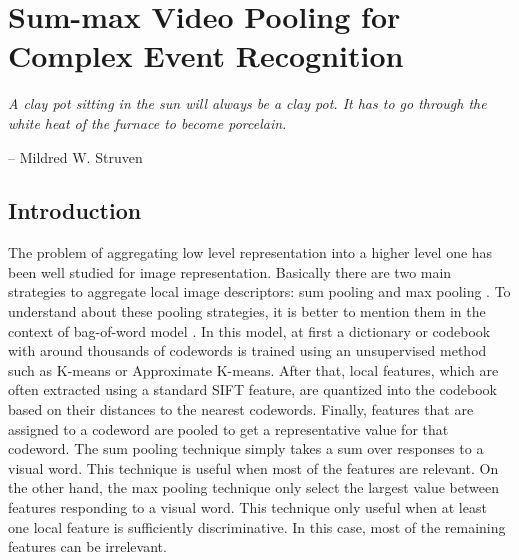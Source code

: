 
\chapter{Sum-max Video Pooling for Complex Event Recognition}
\label{chapter4}
\epigraph{\textit{A clay pot sitting in the sun will always be a clay pot. It has to go through the white heat of the furnace to become porcelain.}}{ -- Mildred W. Struven}

\ifpdf
    \graphicspath{{Chapter4/Figs/Raster/}{Chapter4/Figs/PDF/}{Chapter4/Figs/}}
\else
    \graphicspath{{Chapter4/Figs/Vector/}{Chapter4/Figs/}}
\fi

\section{Introduction}
\label{sec:intro}

The problem of aggregating low level representation into a higher level one has been well studied for image representation. Basically there are two main strategies to aggregate local image descriptors: sum pooling \cite{Koenderink:1999} and max pooling \cite{Serre05objectrecognition}. To understand about these pooling strategies, it is better to mention them in the context of bag-of-word model \cite{Csurka04visualcategorization}. In this model, at first a dictionary or codebook with around thousands of codewords is trained using an unsupervised method such as K-means or Approximate K-means. After that, local features, which are often extracted using a standard SIFT \cite{Lowe:2004} feature, are quantized into the codebook based on their distances to the nearest codewords. Finally, features that are assigned to a codeword are pooled to get a representative value for that codeword. The sum pooling technique simply takes a sum over responses to a visual word. This technique is useful when most of the features are relevant. On the other hand, the max pooling technique only select the largest value between features responding to a visual word. This technique only useful when at least one local feature is sufficiently discriminative. In this case, most of the remaining features can be irrelevant.

